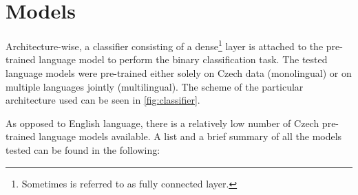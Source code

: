\section{Models}
Architecture-wise, a classifier consisting of a dense\footnote{Sometimes is referred to as fully connected layer.} layer is attached to the pre-trained language model to perform the binary classification task. The tested language models were pre-trained either solely on Czech data (monolingual) or on multiple languages jointly (multilingual). The scheme of the particular architecture used can be seen in \ref{fig:classifier}.

As opposed to English language, there is a relatively low number of Czech pre-trained language models available. A list and a brief summary of all the models tested can be found in the following:



\begin{figure}
\end{figure}



